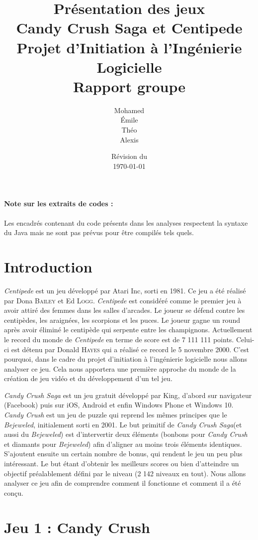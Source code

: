 \documentclass[a4paper, 12pt, oneside]{article}
\title{Présentation des jeux\\Candy Crush Saga et Centipede\\{\Large Projet d'Initiation à l'Ingénierie Logicielle\\Rapport groupe \no 3}}
\author{Mohamed \bsc{Lakhal}\\Émile \bsc{Jeannin}\\Théo \bsc{Mottet}\\Alexis \bsc{Cabodi}}
\date{Révision du\\\today}
\newcommand{\oeuvre}[1]{\textit{#1}}
\newcommand{\Candy}{\oeuvre{Candy Crush}\xspace} %
\newcommand{\CandyS}{\oeuvre{Candy Crush Saga}\xspace}
\newcommand{\Centi}{\oeuvre{Centipede}\xspace}
\begin{document}
\maketitle
\newpage
\tableofcontents
\bigskip
\paragraph*{Note sur les extraits de codes :} Les encadrés contenant du code présents dans les analyses respectent la syntaxe du Java mais ne sont pas prévus pour être compilés tels quels.%

\newpage

\section{Introduction}
\Centi est un jeu développé par Atari Inc, sorti en 1981. Ce jeu a été réalisé par Dona \textsc{Bailey} et Ed \textsc{Logg}. \Centi est considéré comme le premier jeu à avoir attiré des femmes dans les salles d'arcades. 
Le joueur se défend contre les centipèdes, les araignées, les scorpions et les puces. Le joueur gagne un round après avoir éliminé le centipède qui serpente entre les champignons. Actuellement le record du monde de \Centi en terme de score est de 7 111 111 points. Celui-ci est détenu par Donald \textsc{Hayes} qui a réalisé ce record le 5 novembre 2000. 
C'est pourquoi, dans le cadre du projet d'initiation à l'ingénierie logicielle nous allons analyser ce jeu. Cela nous apportera une première approche du monde de la création de jeu vidéo et du développement d'un tel jeu. 

\CandyS est un jeu gratuit développé par King, d'abord sur navigateur (Facebook) puis sur iOS, Android et enfin Windows Phone et Windows 10. \Candy est un jeu de puzzle qui reprend les mêmes principes que le \oeuvre{Bejeweled}, initialement sorti en 2001. Le but primitif de \CandyS (et aussi du \oeuvre{Bejeweled}) est d'intervertir deux éléments (bonbons pour \Candy et diamants pour \oeuvre{Bejeweled}) afin d'aligner au moins trois éléments identiques. S'ajoutent ensuite un certain nombre de bonus, qui rendent le jeu un peu plus intéressant. Le but étant d'obtenir les meilleurs scores ou bien d'atteindre un objectif préalablement défini par le niveau (2 142 niveaux en tout). Nous allons analyser ce jeu afin de comprendre comment il fonctionne et comment il a été conçu.

\newpage
\section{Jeu 1 : Candy Crush}

\newpage
\end{document}
